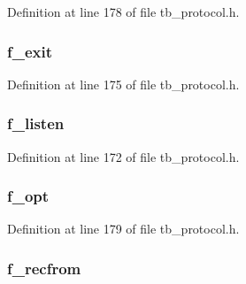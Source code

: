 Definition at line 178 of file tb\-\_\-protocol.\-h.

\hypertarget{structtb__protocol__t_ac430cf8f7a44acfe53a981335b9436a9}{
\subsubsection[{f\-\_\-exit}]{ f\-\_\-exit}}\label{structtb__protocol__t_ac430cf8f7a44acfe53a981335b9436a9}


Definition at line 175 of file tb\-\_\-protocol.\-h.

\hypertarget{structtb__protocol__t_a981417cf0cb6a8b6559288520f60c5a1}{
\subsubsection[{f\-\_\-listen}]{ f\-\_\-listen}}\label{structtb__protocol__t_a981417cf0cb6a8b6559288520f60c5a1}


Definition at line 172 of file tb\-\_\-protocol.\-h.

\hypertarget{structtb__protocol__t_abf29463c11fbb3ef0acccb80ca7c2c48}{
\subsubsection[{f\-\_\-opt}]{ f\-\_\-opt}}\label{structtb__protocol__t_abf29463c11fbb3ef0acccb80ca7c2c48}


Definition at line 179 of file tb\-\_\-protocol.\-h.

\hypertarget{structtb__protocol__t_a01abb6c514ece717e5dd4ee4c9069fb6}{
\subsubsection[{f\-\_\-recfrom}]{ f\-\_\-recfrom}}\label{structtb__protocol__t_a01abb6c514ece717e5dd4ee4c9069fb6}


